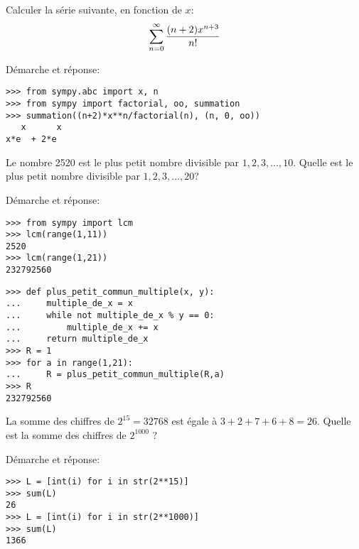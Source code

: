 \begin{question}[2 pts]
    Calculer la série suivante, en fonction de $x$:
    \[
	\sum_{n=0}^{\infty} {(n+2) x^{n+3}\over n!}
    \]
\begin{mybox}
Démarche et réponse:
\begin{reponse}
\begin{verbatim}
>>> from sympy.abc import x, n
>>> from sympy import factorial, oo, summation
>>> summation((n+2)*x**n/factorial(n), (n, 0, oo))
   x      x
x*e  + 2*e
\end{verbatim}
\end{reponse}
\end{mybox}
\end{question}

\newpage
\begin{question}[2 pts]
    Le nombre 2520 est le plus petit nombre divisible par
    $1, 2, 3, \dots, 10$.
    Quelle est le plus petit nombre divisible par 
    $1, 2, 3, \dots, 20$?
\begin{mybox}
Démarche et réponse:\\
\begin{reponse}
\begin{minipage}[t]{.40\textwidth}
\begin{verbatim}
>>> from sympy import lcm
>>> lcm(range(1,11))
2520
>>> lcm(range(1,21))
232792560
\end{verbatim}
\end{minipage}
\begin{minipage}[t]{0.5\textwidth}
\begin{verbatim}
>>> def plus_petit_commun_multiple(x, y):
...     multiple_de_x = x
...     while not multiple_de_x % y == 0:
...         multiple_de_x += x
...     return multiple_de_x
>>> R = 1
>>> for a in range(1,21):
...     R = plus_petit_commun_multiple(R,a)
>>> R
232792560
\end{verbatim}
\end{minipage}
\end{reponse}
\end{mybox}
\end{question}

\begin{question}[1 pts]
    La somme des chiffres de $2^{15}=32768$ est égale à $3+2+7+6+8=26$.
    Quelle est la somme des chiffres de $2^{1000}$ ?
\begin{mybox}
Démarche et réponse:
\begin{reponse}
\begin{verbatim}
>>> L = [int(i) for i in str(2**15)]
>>> sum(L)
26
>>> L = [int(i) for i in str(2**1000)]
>>> sum(L)
1366
\end{verbatim}
\end{reponse}
\end{mybox}
\end{question}



